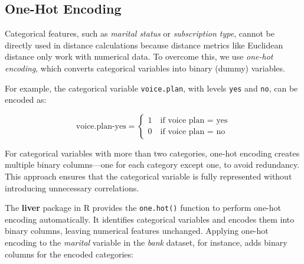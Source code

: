 \documentclass[
]{book}
\newcommand{\passthrough}[1]{#1}
\theoremstyle{definition}
\theoremstyle{definition}
\theoremstyle{definition}
\theoremstyle{definition}
\theoremstyle{remark}
\begin{document}
\subsection{One-Hot Encoding}\label{one-hot-encoding-1}

Categorical features, such as \emph{marital status} or \emph{subscription type}, cannot be directly used in distance calculations because distance metrics like Euclidean distance only work with numerical data. To overcome this, we use \emph{one-hot encoding}, which converts categorical variables into binary (dummy) variables.

For example, the categorical variable \passthrough{\lstinline!voice.plan!}, with levels \passthrough{\lstinline!yes!} and \passthrough{\lstinline!no!}, can be encoded as:

\[
\text{voice.plan-yes} = 
\begin{cases}
1 \quad \text{if voice plan = yes}  \\
0 \quad \text{if voice plan = no} 
\end{cases}
\]

For categorical variables with more than two categories, one-hot encoding creates multiple binary columns---one for each category except one, to avoid redundancy. This approach ensures that the categorical variable is fully represented without introducing unnecessary correlations.

The \textbf{liver} package in R provides the \passthrough{\lstinline!one.hot()!} function to perform one-hot encoding automatically. It identifies categorical variables and encodes them into binary columns, leaving numerical features unchanged. Applying one-hot encoding to the \emph{marital} variable in the \emph{bank} dataset, for instance, adds binary columns for the encoded categories:
\end{document}
